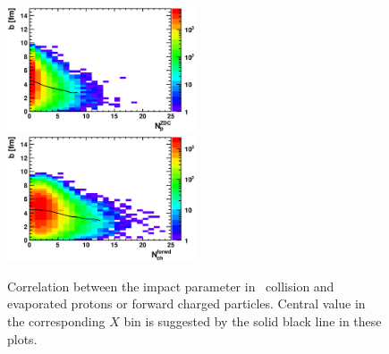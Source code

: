 \begin{figure} 
\begin{center} 
\includegraphics[width=0.495\textwidth]{plots/chpt7/tau9_bimpact_vs_accept_proton.eps}
\includegraphics[width=0.495\textwidth]{plots/chpt7/tau9_bimpact_vs_accept_forward_charged.eps}
\caption[Correlation between the impact parameter in \eA\ collision and evaporated protons or forward charged particles]
{Correlation between the impact parameter in \eA\ collision and evaporated protons or forward charged particles. Central value in the corresponding $X$ bin is suggested by the solid black line in these plots.
}
\label{fig:bimp_corre_p_forCh}
\end{center} 
\end{figure}


